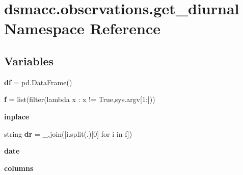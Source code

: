 \hypertarget{namespacedsmacc_1_1observations_1_1get__diurnal}{}\section{dsmacc.\+observations.\+get\+\_\+diurnal Namespace Reference}
\label{namespacedsmacc_1_1observations_1_1get__diurnal}
\subsection*{Variables}
\begin{DoxyCompactItemize}
\item 
\mbox{\label{namespacedsmacc_1_1observations_1_1get__diurnal_a913883661be023e5318fd82cd5d9d73a}} 
{\bfseries df} = pd.\+Data\+Frame()
\item 
\mbox{\label{namespacedsmacc_1_1observations_1_1get__diurnal_a4d2fdfe2ec018716282a10c28b75929b}} 
{\bfseries f} = list(filter(lambda x \+: x != \textquotesingle{}True\textquotesingle{},sys.\+argv\mbox{[}1\+:\mbox{]}))
\item 
\mbox{\label{namespacedsmacc_1_1observations_1_1get__diurnal_ac275a4f55671597f5e76ac3c52174d32}} 
{\bfseries inplace}
\item 
\mbox{\label{namespacedsmacc_1_1observations_1_1get__diurnal_aef9ba65f80fdf8e9acd289d4a4e5b5c5}} 
string {\bfseries dr} = \textquotesingle{}\+\_\+\textquotesingle{}.join(\mbox{[}i.\+split(\textquotesingle{}.\textquotesingle{})\mbox{[}0\mbox{]} for i in f\mbox{]})
\item 
\mbox{\label{namespacedsmacc_1_1observations_1_1get__diurnal_a35f252d52a909ac318ea8b38a2557f70}} 
{\bfseries date}
\item 
\mbox{\label{namespacedsmacc_1_1observations_1_1get__diurnal_a2777291e478e3b9699b1d2b6cf10884c}} 
{\bfseries columns}
\item 
\mbox{\label{namespacedsmacc_1_1observations_1_1get__diurnal_aad9c8bdafe36064863015928e3a1eb27}} 

\end{DoxyCompactItemize}
